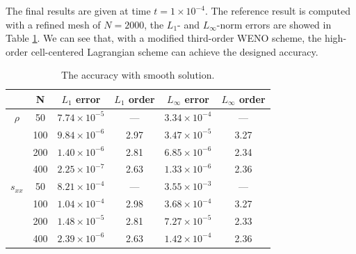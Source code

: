 \documentclass{article}
\numberwithin{equation}{section}
\numberwithin{table}{section}
\begin{document}
The final results are given at time $t = 1 \times 10^{-4}$. The reference  result is computed with a refined mesh of $N = 2000$, the  $L_1 $- and $ L_\infty$-norm  errors  are showed in Table \ref{tab:1}. We can see that,  with a  modified third-order WENO scheme, the high-order cell-centered Lagrangian scheme can  achieve the designed  accuracy.

\begin{table}[htbp]
  \small
  \centering
\setlength{\belowcaptionskip}{10pt}
\caption{\small The accuracy with smooth solution.}
  \begin{tabular}{cccccc}
	\toprule
	        & N       & $L_1$ error  & $L_1$ order & $L_{\infty}$ error & $L_{\infty}$ order \\
	\midrule
	$ \rho $      &50           &  $7.74\times 10^{-5}$     &---         &  $3.34\times 10^{-4}$         & ---  \\
			      &100          &  $9.84\times 10^{-6}$     &2.97        &  $3.47\times 10^{-5}$         & 3.27 \\
	              &200          &  $1.40\times 10^{-6}$     &2.81        &  $6.85\times 10^{-6}$		 & 2.34 \\
				  &400          &  $2.25\times 10^{-7}$     &2.63        &  $1.33\times 10^{-6}$         & 2.36 \\
	$s_{xx}$     &50           &  $8.21\times 10^{-4}$     &---         &  $3.55\times 10^{-3}$         & ---  \\
				  &100          &  $1.04\times 10^{-4}$     &2.98        &  $3.68\times 10^{-4}$         & 3.27 \\
				  &200          &  $1.48\times 10^{-5}$     &2.81        &  $7.27\times 10^{-5}$         & 2.33 \\
				  &400          &  $2.39\times 10^{-6}$     &2.63        &  $1.42\times 10^{-4}$         & 2.36 \\
	\bottomrule
	\end{tabular}
\label{tab:1}
\end{table}
\end{document}
